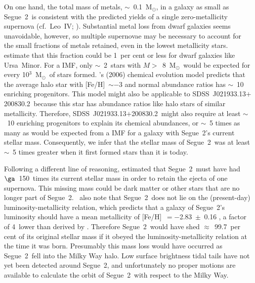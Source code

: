 \documentclass[useAMS,usenatbib,usegraphicx]{mn2e}
\def\msun{\mbox{M$_{\odot}$}}
\def\seg{\mbox{SDSS~J021933.13$+$200830.2}}
\def\seggal{\mbox{Segue~2}}
\def\umigal{\mbox{Ursa Minor}}
\def\leogal{\mbox{Leo~IV}}
\begin{document}
On one hand, the total mass of metals, $\sim$~0.1~\msun,
in a galaxy as small as \seggal\ is consistent with
the predicted yields of a single zero-metallicity 
supernova (cf.\ \leogal; \citealt{simon10}).
Substantial metal loss from dwarf galaxies seems unavoidable, however,
so multiple supernovae may be necessary to 
account for the small fractions of metals retained,
even in the lowest metallicity stars.
\citet{kirby11c} estimate that this fraction could
be 1~per cent or less for dwarf galaxies
like \umigal.
For a \citet{salpeter55} IMF,
only $\sim$~2~stars with $M >$~8~\msun\ would be expected
for every 10$^{3}$~\msun\ of stars formed.
\citeauthor{tumlinson06}'s (2006) chemical evolution model 
predicts that the average halo star with [Fe/H]~$\sim -$3
and normal abundance ratios
has $\sim$~10 enriching progenitors.
This model might also be applicable to \seg\
because this star has abundance ratios like halo stars
of similar metallicity.
Therefore, \seg\ might also require at least $\sim$~10
enriching progenitors to explain its chemical abundances,
or $\sim$~5 times as many as would be expected from a 
\citeauthor{salpeter55} IMF for a galaxy with
\seggal's current stellar mass.
Consequently, we infer that the stellar mass of \seggal\
was at least $\sim$~5 times greater when it first formed stars
than it is today.

Following a different line of reasoning,
\citet{kirby13} estimated that \seggal\ must have had
$\ga$~150~times its current stellar mass
in order to retain the ejecta of one supernova.
This missing mass could be dark matter or other stars
that are no longer part of \seggal.
\citeauthor{kirby13}\ also note that
\seggal\ does not lie on the (present-day)
luminosity-metallicity relation, which
predicts that a galaxy of \seggal's luminosity
should have a mean metallicity of [Fe/H]~$= -$2.83~$\pm$~0.16
\citep{kirby11b},
a factor of 4~lower than derived by \citet{kirby13}.  %
Therefore
\seggal\ would have shed $\approx$~99.7~per cent
of its original stellar mass if it obeyed the
luminosity-metallicity relation 
at the time it was born.
Presumably this mass loss would have occurred as
\seggal\ fell into the Milky Way halo.
Low surface brightness tidal tails have not yet been
detected around \seggal, and 
unfortunately no proper motions
are available to calculate the orbit of \seggal\
with respect to the Milky Way.
\end{document}
